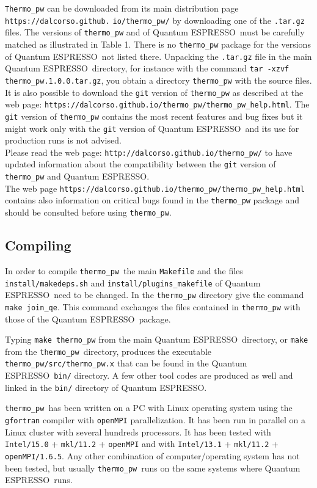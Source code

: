 \documentclass[12pt,a4paper]{article}
\def\qe{{\sc Quantum ESPRESSO}}
\def\thermo{\texttt{thermo\_pw}}
\begin{document}
\texttt{Thermo\_pw} can be downloaded from its main distribution page
\texttt{https://dalcorso.github.} \texttt{io/thermo\_pw/}
by downloading one of the \texttt{.tar.gz} files.
The versions of \texttt{thermo\_pw} and of \qe\ must be carefully matched
as illustrated in Table 1. 
There is no \texttt{thermo\_pw} package for the versions of \qe\ not listed 
there. Unpacking the \texttt{.tar.gz} file in the main \qe\ directory, for
instance with the command \texttt{tar -xzvf thermo\_pw.1.0.0.tar.gz}, you
obtain a directory \texttt{thermo\_pw} with the source files. \\
It is also possible to download the \texttt{git} version of 
\texttt{thermo\_pw} as described at
the web page: 
\texttt{https://dalcorso.github.io/thermo\_pw/thermo\_pw\_help.html}.
The \texttt{git} version of \texttt{thermo\_pw} contains the most recent
features and bug fixes but it might work only with the \texttt{git} 
version of \qe\ and its use for production runs is not advised. \\
Please read the web page: 
\texttt{http://dalcorso.github.io/thermo\_pw/} 
to have updated information about the compatibility between the \texttt{git} 
version of \texttt{thermo\_pw} and \qe. \\
The web page \texttt{https://dalcorso.github.io/thermo\_pw/thermo\_pw\_help.html}
contains also information on critical bugs found in the 
\texttt{thermo\_pw} package and should be consulted before using 
\texttt{thermo\_pw}.

\subsection{\color{web-blue}Compiling}

In order to compile \thermo\ the main \texttt{Makefile} and the files
\texttt{install/makedeps.sh} and \texttt{install/plugins\_makefile}
of \qe\ need to be changed. In the \texttt{thermo\_pw}
directory give the command \texttt{make join\_qe}. This command exchanges
the files contained in \texttt{thermo\_pw} with those of the \qe\ package.

Typing \texttt{make thermo\_pw} from the main \qe\ directory, or \texttt{make} 
from the \texttt{thermo\_pw}\ directory, produces the executable
\texttt{thermo\_pw/src/thermo\_pw.x} that can be found in the 
\qe\ \texttt{bin/} directory. A few other tool codes are produced as well
and linked in the \texttt{bin/} directory of \qe.

\thermo\ has been written on a PC with Linux operating system using the
\texttt{gfortran} compiler with \texttt{openMPI} parallelization. It has
been run in parallel on a Linux cluster with several hundreds processors.
It has been tested with \texttt{Intel/15.0} + \texttt{mkl/11.2} +
\texttt{openMPI} and with \texttt{Intel/13.1} + \texttt{mkl/11.2} +
\texttt{openMPI/1.6.5}.
Any other combination of computer/operating system has not been tested, but 
usually \thermo\ runs on the same systems where \qe\ runs. 
\end{document}
